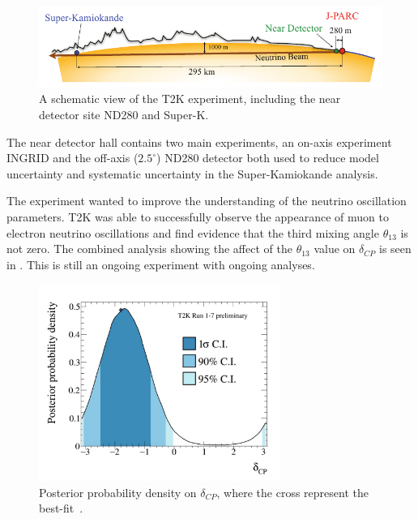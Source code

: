 \begin{figure}[h!]
\centering
  \centering
\includegraphics[width=\textwidth]{figures/T2KBeam.png}
\vspace{2mm}
\caption{A schematic view of the T2K experiment, including the near detector site ND280 and Super-K.}
\label{fig:T2K}
\end{figure}

The near detector hall contains two main experiments, an on-axis experiment INGRID and the off-axis ($2.5^\circ$) ND280 detector both used to reduce model uncertainty and systematic uncertainty in the Super-Kamiokande analysis. %

The experiment wanted to improve the understanding of the neutrino oscillation parameters. T2K was able to successfully observe the appearance of muon to electron neutrino oscillations and find evidence that the third mixing angle $\theta_{13}$ is not zero. The combined analysis showing the affect of the $\theta_{13}$ value on $\delta_{CP}$ is seen in . This is still an ongoing experiment with ongoing analyses.


\begin{figure}[h!]
\centering
  \centering
\includegraphics[width=0.7\textwidth]{figures/t2k1.jpeg}
\vspace{2mm}
\caption{Posterior probability density on $\delta_{CP}$, where the cross represent the best-fit~\cite{T2Kfigures}.}
\label{fig:T2KCP}
\end{figure}

